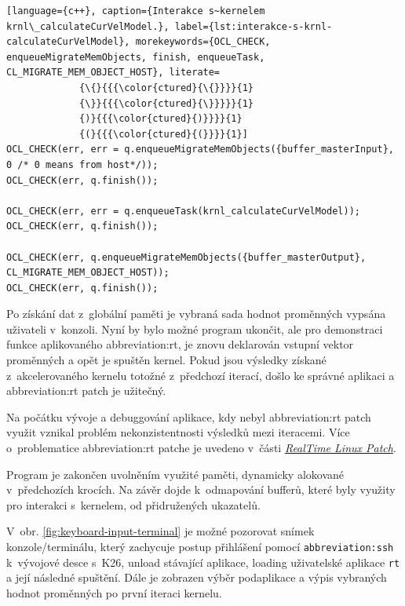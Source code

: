 \documentclass[a4paper, twoside, 11pt]{article}
\begin{document}
		\begin{lstlisting}[language={c++}, caption={Interakce s~kernelem krnl\_calculateCurVelModel.}, label={lst:interakce-s-krnl-calculateCurVelModel}, morekeywords={OCL_CHECK, enqueueMigrateMemObjects, finish, enqueueTask, CL_MIGRATE_MEM_OBJECT_HOST}, literate=
			 {\{}{{{\color{ctured}{\{}}}}{1}
			 {\}}{{{\color{ctured}{\}}}}}{1}
			 {)}{{{\color{ctured}{)}}}}{1}
			 {(}{{{\color{ctured}{(}}}}{1}]
OCL_CHECK(err, err = q.enqueueMigrateMemObjects({buffer_masterInput}, 0 /* 0 means from host*/));
OCL_CHECK(err, q.finish());

OCL_CHECK(err, err = q.enqueueTask(krnl_calculateCurVelModel));
OCL_CHECK(err, q.finish());

OCL_CHECK(err, q.enqueueMigrateMemObjects({buffer_masterOutput}, CL_MIGRATE_MEM_OBJECT_HOST));
OCL_CHECK(err, q.finish());
\end{lstlisting}

	Po získání dat z~globální paměti je vybraná sada hodnot proměnných vypsána uživateli v~konzoli. Nyní by bylo možné program ukončit, ale pro demonstraci funkce aplikovaného \gls{abbreviation:rt}, je znovu deklarován vstupní vektor proměnných a opět je spuštěn kernel. Pokud jsou výsledky získané z~akcelerovaného kernelu totožné z~předchozí iterací, došlo ke správné aplikaci a \gls{abbreviation:rt} patch je užitečný.\par
	Na počátku vývoje a debuggování aplikace, kdy nebyl \gls{abbreviation:rt} patch využit vznikal problém nekonzistentnosti výsledků mezi iteracemi. Více o~problematice \gls{abbreviation:rt} patche je uvedeno v~části \hyperref[subsec:real-time-linux-patch]{\textit{RealTime Linux Patch}}.\par
	Program je zakončen uvolněním využité paměti, dynamicky alokované v~předchozích krocích. Na závěr dojde k~odmapování bufferů, které byly využity pro interakci s~kernelem, od přidružených ukazatelů.\par
	V~obr. \ref{fig:keyboard-input-terminal} je možné pozorovat snímek konzole/terminálu, který zachycuje postup přihlášení pomocí \texttt{\gls{abbreviation:ssh}} k~vývojové desce s~K26, unload stávající aplikace, loading uživatelské aplikace \texttt{rt} a její následné spuštění. Dále je zobrazen výběr podaplikace a výpis vybraných hodnot proměnných po první iteraci kernelu.
\end{document}
